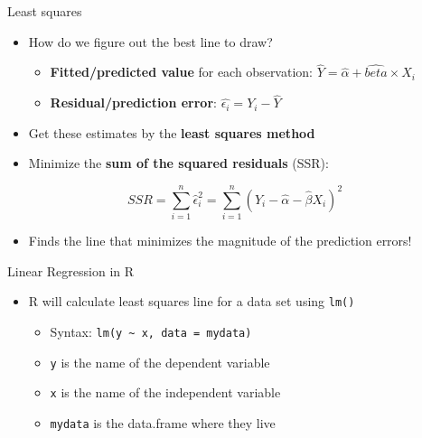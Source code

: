 \documentclass[
  ignorenonframetext,
]{beamer}
\providecommand{\tightlist}{%
  \setlength{\itemsep}{0pt}\setlength{\parskip}{0pt}}
\begin{document}
\begin{frame}{Least squares}
\label{least-squares}
\pause

\begin{itemize}
\tightlist
\item
  How do we figure out the best line to draw? \pause

  \begin{itemize}
  \tightlist
  \item
    \textbf{Fitted/predicted value} for each observation:
    \(\hat{Y} = \hat{\alpha} + \hat{beta} \times X_i\) \pause
  \item
    \textbf{Residual/prediction error}:
    \(\hat{\epsilon_i} = Y_i - \hat{Y}\) \pause
  \end{itemize}
\item
  Get these estimates by the \textbf{least squares method} \pause
\item
  Minimize the \textbf{sum of the squared residuals} (SSR): \pause
\end{itemize}

\[
SSR = \sum_{i=1}^{n} \hat{\epsilon}_i^2 = \sum_{i=1}^n (Y_i - \hat{\alpha} - \hat{\beta}X_i)^2
\]

\pause

\begin{itemize}
\tightlist
\item
  Finds the line that minimizes the magnitude of the prediction errors!
\end{itemize}
\end{frame}

\begin{frame}[fragile]{Linear Regression in R}
\label{linear-regression-in-r}
\pause

\begin{itemize}
\tightlist
\item
  R will calculate least squares line for a data set using \texttt{lm()}
  \pause

  \begin{itemize}
  \tightlist
  \item
    Syntax: \texttt{lm(y\ \textasciitilde{}\ x,\ data\ =\ mydata)}
    \pause
  \item
    \texttt{y} is the name of the dependent variable
  \item
    \texttt{x} is the name of the independent variable
  \item
    \texttt{mydata} is the data.frame where they live
  \end{itemize}
\end{itemize}
\end{frame}
\end{document}
